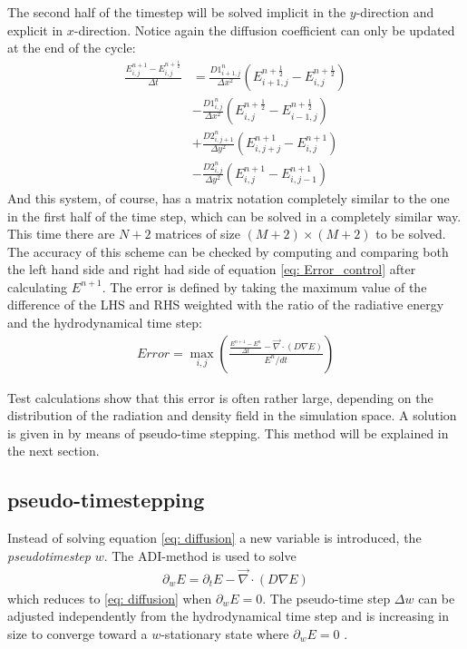 The second half of the timestep will be solved implicit in the $y$-direction and explicit in $x$-direction. Notice again the diffusion coefficient can only be updated at the end of the cycle:
\begin{align}
\frac{E_{i,j}^{n+1} - E_{i,j}^{n+\frac{1}{2}}}{\Delta t}
 &= \frac{D1_{i+1,j}^{n}}{\Delta x^2} (E_{i+1,j}^{n+\frac{1}{2}} - E_{i,j}^{n+\frac{1}{2}}) \\
 &- \frac{D1_{i,j}^{n}}{\Delta x^2} (E_{i,j}^{n+\frac{1}{2}} - E_{i-1,j}^{n+\frac{1}{2}}) \\
 &+ \frac{D2_{i,j+1}^{n}}{\Delta y^2} (E_{i,j+j}^{n+1} - E_{i,j}^{n+1}) \\
 &- \frac{D2_{i,j}^{n}}{\Delta y^2} (E_{i,j}^{n+1} - E_{i,j-1}^{n+1})
\end{align}
And this system, of course, has a matrix notation completely similar to the one in the first half of the time step, which can be solved in a completely similar way. This time there are $N+2$ matrices of size $(M+2) \times (M+2)$ to be solved. \\

The accuracy of this scheme can be checked by computing and comparing both the left hand side and right had side of equation \eqref{eq: Error_control} after calculating $E^{n+1}$. The error is defined by taking the maximum value of the difference of the LHS and RHS weighted with the ratio of the radiative energy and the hydrodynamical time step:
\begin{align}
Error = \max_{i,j} \left(\frac{\frac{E^{n+1} - E^{n}}{\Delta t} -  \vec{\nabla} \cdot \left(D \nabla E\right)}{E^{n}/dt} \right) \label{eq: Error}
\end{align}

 Test calculations show that this error is often rather large, depending on the distribution of the radiation and density field in the simulation space. A solution is given in \cite{Turner12001} by means of pseudo-time stepping. This method will be explained in the next section.
 
 
\subsection{pseudo-timestepping}
Instead of solving equation \eqref{eq: diffusion} a new variable is introduced, the \emph{pseudotimestep} $w$. The ADI-method is used to solve 
\begin{align}
\partial_w E = \partial_t E  - \vec{\nabla} \cdot \left(D \nabla E\right)
\end{align}
which reduces to \eqref{eq: diffusion} when $\partial_w E = 0$. The pseudo-time step $\Delta w$ can be adjusted independently from the hydrodynamical time step and is increasing in size to converge toward a $w$-stationary state where $\partial_w E = 0$ \cite{Turner12001}.\\

